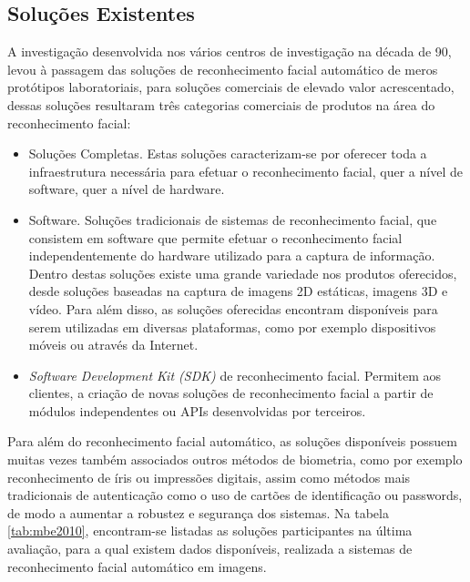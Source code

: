 \subsection{Soluções Existentes}\label{sec:soluções}
A investigação desenvolvida nos vários centros de investigação na década de 90, levou à passagem das soluções de reconhecimento facial automático de meros protótipos laboratoriais, para soluções comerciais de elevado valor acrescentado, dessas soluções resultaram três categorias comerciais de produtos na área do reconhecimento facial:
\begin{itemize}
\item Soluções Completas. Estas soluções caracterizam-se por oferecer toda a infraestrutura necessária para efetuar o reconhecimento facial, quer a nível de software, quer a nível de hardware.
\item Software. Soluções tradicionais de sistemas de reconhecimento facial, que consistem em software que permite efetuar o reconhecimento facial independentemente do hardware utilizado para a captura de informação.  Dentro destas soluções existe uma grande variedade nos produtos oferecidos, desde soluções baseadas na captura de imagens 2D estáticas, imagens 3D e vídeo. Para além disso, as soluções oferecidas encontram disponíveis para serem utilizadas em diversas plataformas, como por exemplo dispositivos móveis ou através da Internet.
\item \textit{Software Development Kit (SDK)} de reconhecimento facial. Permitem aos clientes, a criação de novas soluções de reconhecimento facial a partir de módulos independentes ou APIs desenvolvidas por terceiros.
\end{itemize}

Para além do reconhecimento facial automático, as soluções disponíveis possuem muitas vezes também associados outros métodos de biometria, como por exemplo reconhecimento de íris ou impressões digitais, assim como métodos mais tradicionais de autenticação como o uso de cartões de identificação ou passwords, de modo a aumentar a robustez e segurança dos sistemas.
Na tabela \ref{tab:mbe2010}, encontram-se listadas as soluções participantes na última avaliação, para a qual existem dados disponíveis, realizada a sistemas de reconhecimento facial automático em imagens.

